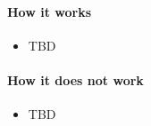 \paragraph*{How it works}

\begin{itemize}[noitemsep]
  \item[$\boxplus$] TBD
\end{itemize}


\paragraph*{How it does not work}

\begin{itemize}[noitemsep]
  \item[$\boxminus$] TBD
\end{itemize}

